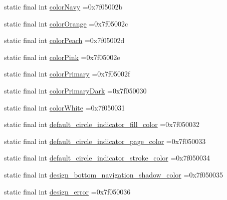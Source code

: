 \begin{DoxyCompactItemize}
\item 
static final int \mbox{\hyperlink{classcom_1_1example_1_1trainawearapplication_1_1_r_1_1color_acc36b3588b424f9a11eab9ef7f4d5807}{color\+Navy}} =0x7f05002b
\item 
static final int \mbox{\hyperlink{classcom_1_1example_1_1trainawearapplication_1_1_r_1_1color_ae7b8e90f0c7490a067fe4bced707f232}{color\+Orange}} =0x7f05002c
\item 
static final int \mbox{\hyperlink{classcom_1_1example_1_1trainawearapplication_1_1_r_1_1color_a9f8f0e0694a2c7820bc4ecb8ce9e07ad}{color\+Peach}} =0x7f05002d
\item 
static final int \mbox{\hyperlink{classcom_1_1example_1_1trainawearapplication_1_1_r_1_1color_a6154c4c963b2c10ec8a9ebc88b62bed5}{color\+Pink}} =0x7f05002e
\item 
static final int \mbox{\hyperlink{classcom_1_1example_1_1trainawearapplication_1_1_r_1_1color_a3946a5272c989321720cb4fd061ac844}{color\+Primary}} =0x7f05002f
\item 
static final int \mbox{\hyperlink{classcom_1_1example_1_1trainawearapplication_1_1_r_1_1color_a6bdda9611b038fd6abc100077bf23003}{color\+Primary\+Dark}} =0x7f050030
\item 
static final int \mbox{\hyperlink{classcom_1_1example_1_1trainawearapplication_1_1_r_1_1color_a413f8602fe0cd77b48ed5226b90dc74e}{color\+White}} =0x7f050031
\item 
static final int \mbox{\hyperlink{classcom_1_1example_1_1trainawearapplication_1_1_r_1_1color_a4606d42d0033b7835c676cebedbf1f1f}{default\+\_\+circle\+\_\+indicator\+\_\+fill\+\_\+color}} =0x7f050032
\item 
static final int \mbox{\hyperlink{classcom_1_1example_1_1trainawearapplication_1_1_r_1_1color_aee97eef0b659a4559126a7c088d0254d}{default\+\_\+circle\+\_\+indicator\+\_\+page\+\_\+color}} =0x7f050033
\item 
static final int \mbox{\hyperlink{classcom_1_1example_1_1trainawearapplication_1_1_r_1_1color_ae167da960cbbeb2dead2f8b2f642b58b}{default\+\_\+circle\+\_\+indicator\+\_\+stroke\+\_\+color}} =0x7f050034
\item 
static final int \mbox{\hyperlink{classcom_1_1example_1_1trainawearapplication_1_1_r_1_1color_abafab361cf7983c2838d9f7c513e2944}{design\+\_\+bottom\+\_\+navigation\+\_\+shadow\+\_\+color}} =0x7f050035
\item 
static final int \mbox{\hyperlink{classcom_1_1example_1_1trainawearapplication_1_1_r_1_1color_a042421178ad26afcefd435c84d1f4156}{design\+\_\+error}} =0x7f050036

\end{DoxyCompactItemize}
